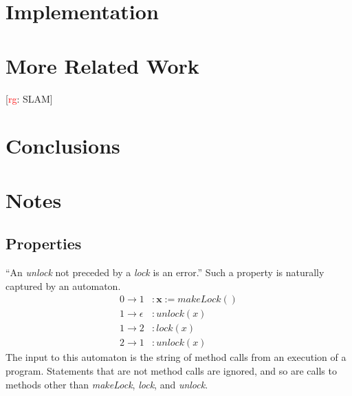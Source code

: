 \documentclass[a4paper]{article}
\newcommand{\todo}[2]{{\small [\textcolor{red}{#1}: #2]}}
\newcommand{\rg}[1]{\todo{rg}{#1}}
\theoremstyle{remark}
\begin{document}
\section{Implementation}

\section{More Related Work}

\rg{SLAM}
\section{Conclusions}
\section{Notes}

\subsection{Properties}\label{sec:properties} %

``An \textit{unlock} not preceded by a \textit{lock} is an error.''
Such a property is naturally captured by an automaton.
\begin{equation}\label{eq:unlockunlock}
\begin{aligned}
0\to1&: \mathbf{x} := \mathit{makeLock}()\\
1\to\epsilon&: \mathit{unlock}(x)\\
1\to2&: \mathit{lock}(x)\\
2\to1&: \mathit{unlock}(x)
\end{aligned}
\end{equation}
The input to this automaton is the string of method calls from an execution of a program.
Statements that are not method calls are ignored, and so are calls to methods other than \textit{makeLock}, \textit{lock}, and \textit{unlock}.
\end{document}
